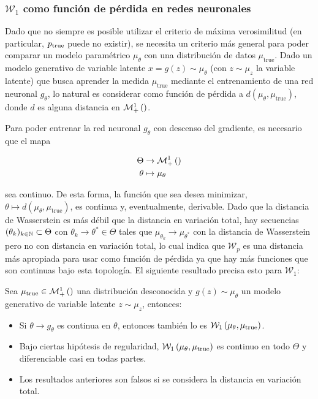 \subsubsection{$\mathcal{W}_1$ como función de pérdida en redes neuronales}

Dado que no siempre es posible utilizar el criterio de máxima verosimilitud (en particular, $p_{\operatorname{true}}$ puede no existir), se necesita un criterio más general para poder comparar un modelo paramétrico $\mu_\theta$ con una distribución de datos $\mu_{\text{true}}$. Dado un modelo generativo de variable latente $x=g(z)\sim\mu_\theta$ (con $z\sim\mu_z$ la variable latente) que busca aprender la medida $\mu_{\text{true}}$ mediante el entrenamiento de una red neuronal $g_\theta$, lo natural es considerar como función de pérdida a $d(\mu_\theta,\mu_{\text{true}})$, donde $d$ es alguna distancia en $\mathcal{M}_+^1\left(\right)$.

Para poder entrenar la red neuronal $g_\theta$ con descenso del gradiente, es necesario que el mapa

\begin{align*}
	\Theta&\to \mathcal{M}_+^1\left(\right)\\
	\theta&\mapsto \mu_\theta
\end{align*}

sea continuo. De esta forma, la función que sea desea minimizar, $\theta\mapsto d(\mu_\theta,\mu_{\text{true}})$, es continua y, eventualmente, derivable. Dado que la distancia de Wasserstein es más débil que la distancia en variación total, hay secuencias $(\theta_k)_{k\in\mathbb{N}}\subset\Theta$ con $\theta_k\to\theta^*\in\Theta$ tales que $\mu_{\theta_k}\to\mu_{\theta^*}$ con la distancia de Wasserstein pero no con distancia en variación total, lo cual indica que $\mathcal{W}_p$ es una distancia más apropiada para usar como función de pérdida ya que hay más funciones que son continuas bajo esta topología. El siguiente resultado precisa esto para $\mathcal{W}_1$:

\begin{teo}
	Sea $\mu_{\text{true}}\in\mathcal{M}_+^1\left(\right)$ una distribución desconocida y $g(z)\sim\mu_\theta$ un modelo generativo de variable latente $z\sim\mu_z$, entonces:

	\begin{itemize}
		\item Si $\theta\to g_\theta$ es continua en $\theta$, entonces también lo es $\mathcal{W}_{1}\left(\mu_\theta,\mu_{\text{true}}\right)$.
		\item Bajo ciertas hipótesis de regularidad, $\mathcal{W}_{1}\left(\mu_\theta,\mu_{\text{true}}\right)$ es continuo en todo $\Theta$ y diferenciable casi en todas partes.
		\item Los resultados anteriores son falsos si se considera la distancia en variación total.
	\end{itemize}
\end{teo}

